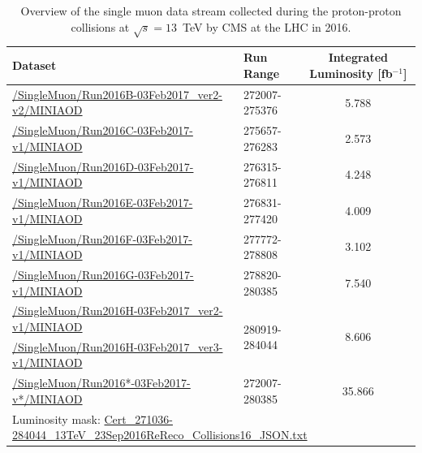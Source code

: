 \begin{table}[!h]
\label{tab:data}
\caption[Data samples.]
{Overview of the single muon data stream collected during the proton-proton collisions at $\sqrt{s}=13$~TeV by CMS at the LHC in 2016.}
\small
\renewcommand{\arraystretch}{1.5}

\begin{tabular}{llc}
        \hline 
        Dataset & Run Range & Integrated Luminosity [fb$^{-1}$]\\
        \hline
        \url{/SingleMuon/Run2016B-03Feb2017_ver2-v2/MINIAOD} & 272007-275376 & 5.788 \\
        \url{/SingleMuon/Run2016C-03Feb2017-v1/MINIAOD}      & 275657-276283 & 2.573 \\
        \url{/SingleMuon/Run2016D-03Feb2017-v1/MINIAOD}      & 276315-276811 & 4.248 \\
        \url{/SingleMuon/Run2016E-03Feb2017-v1/MINIAOD}      & 276831-277420 & 4.009 \\
        \url{/SingleMuon/Run2016F-03Feb2017-v1/MINIAOD}      & 277772-278808 & 3.102 \\
        \url{/SingleMuon/Run2016G-03Feb2017-v1/MINIAOD}      & 278820-280385 & 7.540 \\
        \url{/SingleMuon/Run2016H-03Feb2017_ver2-v1/MINIAOD} & \multirow{2}{*}{280919-284044} & \multirow{2}{*}{8.606} \\ 
        \url{/SingleMuon/Run2016H-03Feb2017_ver3-v1/MINIAOD} &                                &                        \\
        \url{/SingleMuon/Run2016*-03Feb2017-v*/MINIAOD}      & 272007-280385 & 35.866 \\
        \hline
        \multicolumn{3}{l}{Luminosity mask: \url{Cert_271036-284044_13TeV_23Sep2016ReReco_Collisions16_JSON.txt}}    \\
\end{tabular}
\end{table}


